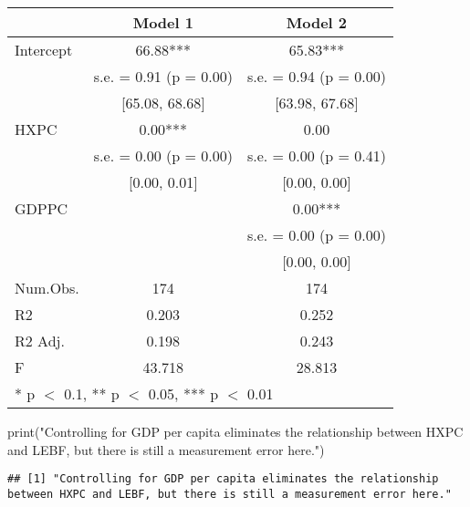 \documentclass[
]{article}
\newenvironment{Shaded}{\begin{snugshade}}{\end{snugshade}}
\newcommand{\CommentTok}[1]{\textcolor[rgb]{0.56,0.35,0.01}{\textit{#1}}}
\newcommand{\DocumentationTok}[1]{\textcolor[rgb]{0.56,0.35,0.01}{\textbf{\textit{#1}}}}
\newcommand{\FunctionTok}[1]{\textcolor[rgb]{0.00,0.00,0.00}{#1}}
\newcommand{\NormalTok}[1]{#1}
\newcommand{\SpecialCharTok}[1]{\textcolor[rgb]{0.00,0.00,0.00}{#1}}
\newcommand{\StringTok}[1]{\textcolor[rgb]{0.31,0.60,0.02}{#1}}
\begin{document}
\begin{table}
\centering
\begin{tabular}[t]{lcc}
\toprule
  & Model 1 & Model 2\\
\midrule
Intercept & \num{66.88}*** & \num{65.83}***\\
 & s.e. = \num{0.91} (p = \num{0.00}) & s.e. = \num{0.94} (p = \num{0.00})\\
 & {}[\num{65.08}, \num{68.68}] & {}[\num{63.98}, \num{67.68}]\\
HXPC & \num{0.00}*** & \num{0.00}\\
 & s.e. = \num{0.00} (p = \num{0.00}) & s.e. = \num{0.00} (p = \num{0.41})\\
 & {}[\num{0.00}, \num{0.01}] & {}[\num{0.00}, \num{0.00}]\\
GDPPC &  & \num{0.00}***\\
 &  & s.e. = \num{0.00} (p = \num{0.00})\\
 &  & {}[\num{0.00}, \num{0.00}]\\
\midrule
Num.Obs. & \num{174} & \num{174}\\
R2 & \num{0.203} & \num{0.252}\\
R2 Adj. & \num{0.198} & \num{0.243}\\
F & \num{43.718} & \num{28.813}\\
\bottomrule
\multicolumn{3}{l}{\rule{0pt}{1em}* p $<$ 0.1, ** p $<$ 0.05, *** p $<$ 0.01}\\
\end{tabular}
\end{table}

\begin{Shaded}
\begin{Highlighting}[]
\FunctionTok{print}\NormalTok{(}\StringTok{"Controlling for GDP per capita eliminates the relationship between HXPC and LEBF, but there is still a measurement error here."}\NormalTok{) }
\end{Highlighting}
\end{Shaded}

\begin{verbatim}
## [1] "Controlling for GDP per capita eliminates the relationship between HXPC and LEBF, but there is still a measurement error here."
\end{verbatim}

\begin{Shaded}
\end{Shaded}
\end{document}
